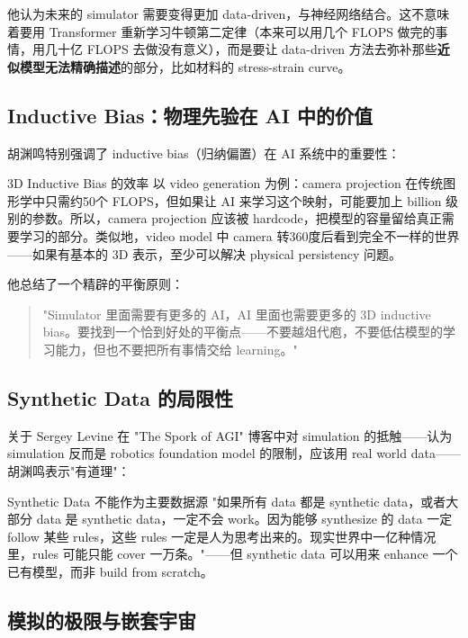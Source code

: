 \documentclass[a4paper]{article}
\begin{document}
他认为未来的 simulator 需要变得更加 data-driven，与神经网络结合。这不意味着要用 Transformer 重新学习牛顿第二定律（本来可以用几个 FLOPS 做完的事情，用几十亿 FLOPS 去做没有意义），而是要让 data-driven 方法去弥补那些\textbf{近似模型无法精确描述}的部分，比如材料的 stress-strain curve。

\subsection{Inductive Bias：物理先验在 AI 中的价值}

胡渊鸣特别强调了 inductive bias（归纳偏置）在 AI 系统中的重要性：

\begin{importantbox}{3D Inductive Bias 的效率}
以 video generation 为例：camera projection 在传统图形学中只需约50个 FLOPS，但如果让 AI 来学习这个映射，可能要加上 billion 级别的参数。所以，camera projection 应该被 hardcode，把模型的容量留给真正需要学习的部分。类似地，video model 中 camera 转360度后看到完全不一样的世界——如果有基本的 3D 表示，至少可以解决 physical persistency 问题。
\end{importantbox}

他总结了一个精辟的平衡原则：

\begin{quote}
"Simulator 里面需要有更多的 AI，AI 里面也需要更多的 3D inductive bias。要找到一个恰到好处的平衡点——不要越俎代庖，不要低估模型的学习能力，但也不要把所有事情交给 learning。"
\end{quote}

\subsection{Synthetic Data 的局限性}

关于 Sergey Levine 在 "The Spork of AGI" 博客中对 simulation 的抵触——认为 simulation 反而是 robotics foundation model 的限制，应该用 real world data——胡渊鸣表示"有道理"：

\begin{warningbox}{Synthetic Data 不能作为主要数据源}
"如果所有 data 都是 synthetic data，或者大部分 data 是 synthetic data，一定不会 work。因为能够 synthesize 的 data 一定 follow 某些 rules，这些 rules 一定是人为思考出来的。现实世界中一亿种情况里，rules 可能只能 cover 一万条。"——但 synthetic data 可以用来 enhance 一个已有模型，而非 build from scratch。
\end{warningbox}

\subsection{模拟的极限与嵌套宇宙}
\end{document}

